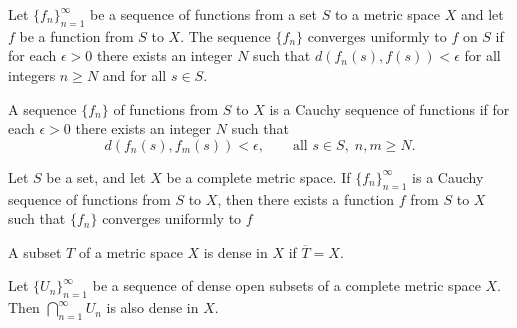 \documentclass[nobib,notoc]{tufte-handout}
\begin{document}
\begin{defi}
	Let \(\{f_n\}_{n=1}^{\infty}\) be a sequence of functions from a set \(S\) to a metric space \(X\) and let \(f\) be a function from \(S\) to \(X\). The sequence \(\{f_n\}\) converges uniformly to \(f\) on \(S\) if for each \(\epsilon>0\) there exists an integer \(N\) such that \(d(f_n(s),f(s))<\epsilon\) for all integers \(n\geq N\) and for all \(s\in S\).
\end{defi}
\begin{defi}
	A sequence \(\{f_n\}\) of functions from \(S\) to \(X\) is a Cauchy sequence of functions if for each \(\epsilon>0\) there exists an integer \(N\) such that
	\begin{equation*}
		d(f_n(s),f_m(s))<\epsilon,\qquad\text{all }s\in S,\; n,m\geq N.
	\end{equation*}
\end{defi}
\begin{thm}
	Let \(S\) be a set, and let \(X\) be a complete metric space. If \(\{f_n\}_{n=1}^{\infty}\) is a Cauchy sequence of functions from \(S\) to \(X\), then there exists a function \(f\) from \(S\) to \(X\) such that \(\{f_n\}\) converges uniformly to \(f\)
	\begin{IEEEproof}
	\end{IEEEproof}
\end{thm}
\begin{defi}
	A subset \(T\) of a metric space \(X\) is dense in \(X\) if \(\overline{T}=X\).
\end{defi}
\begin{thm}
	Let \(\{U_n\}_{n=1}^{\infty}\) be a sequence of dense open subsets of a complete metric space \(X\). Then \(\bigcap_{n=1}^{\infty}U_n\) is also dense in \(X\).
\end{thm}
\end{document}
